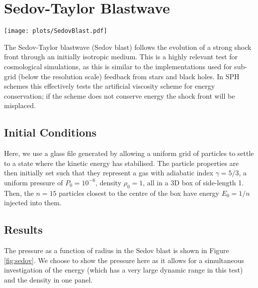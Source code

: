 \section{Sedov-Taylor Blastwave}

\begin{figure*}
    \centering
    \texttt{[image: plots/SedovBlast.pdf]}
    \vspace{-0.7cm}
    \caption{The pressure profile (as a function of radius from the energy
    injection point) for the Sedov-Taylor blastwave, using our various
    schemes. The different panels are all shown at the same time $t=0.05$.
    The blue points show all particles in the simulation volume, with the
    black circles representing binned quantities and their scatter as 
    error bars. The purple dashed line shows the analytic solution.}
    \label{fig:sedov}
\end{figure*}

The Sedov-Taylor blastwave (Sedov blast) \citep{Taylor1950, Sedov1959}
follows the evolution of a strong shock front through an initially isotropic
medium. This is a highly relevant test for cosmological simulations, as this
is similar to the implementations used for sub-grid (below the resolution
scale) feedback from stars and black holes. In SPH schemes this
effectively tests the artificial viscosity scheme for energy conservation; if
the scheme does not conserve energy the shock front will be misplaced.

\subsection{Initial Conditions}

Here, we use a glass file generated by allowing a uniform grid of particles
to settle to a state where the kinetic energy has stabilised. The particle
properties are then initially set such that they represent a gas with
adiabatic index $\gamma = 5/3$, a uniform pressure of $P_0 = 10^{-6}$,
density $\rho_0 = 1$, all in a 3D box of side-length 1. Then, the $n=15$
particles closest to the centre of the box have energy $E_0 = 1/n$ injected
into them.

\subsection{Results}

The pressure as a function of radius in the Sedov blast is shown in Figure
\ref{fig:sedov}. We choose to show the pressure here as it allows for a
simultaneous investigation of the energy (which has a very large dynamic range
in this test) and the density in one panel.

